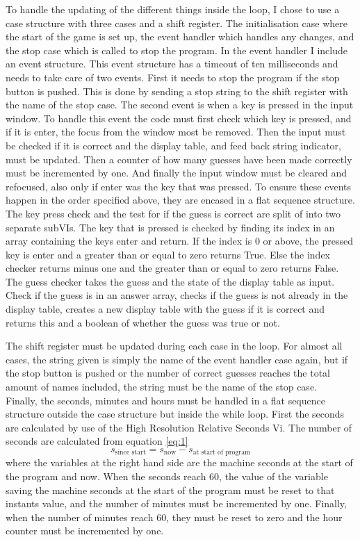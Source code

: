 \documentclass[11pt, A4paper, english]{article}
\begin{document}
To handle the updating of the different things inside the loop, I chose to use a case structure with three cases and a shift register. The initialisation case where the start of the game is set up, the event handler which handles any changes, and the stop case which is called to stop the program. In the event handler I include an event structure. This event structure has a timeout of ten milliseconds and needs to take care of two events. First it needs to stop the program if the stop button is pushed. This is done by sending a stop string to the shift register with the name of the stop case. The second event is when a key is pressed in the input window. To handle this event the code must first check which key is pressed, and if it is enter, the focus from the window most be removed. Then the input must be checked if it is correct and the display table, and feed back string indicator, must be updated. Then a counter of how many guesses have been made correctly must be incremented by one. And finally the input window must be cleared and refocused, also only if enter was the key that was pressed. To ensure these events happen in the order specified above, they are encased in a flat sequence structure. \\

The key press check and the test for if the guess is correct are split of into two separate subVIs. The key that is pressed is checked by finding its index in an array containing the keys enter and return. If the index is 0 or above, the pressed key is enter and a greater than or equal to zero returns True. Else the index checker returns minus one and the greater than or equal to zero returns False. The guess checker takes the guess and the state of the display table as input. Check if the guess is in an answer array, checks if the guess is not already in the display table, creates a new display table with the guess if it is correct and returns this and a boolean of whether the guess was true or not.

The shift register must be updated during each case in the loop. For almost all cases, the string given is simply the name of the event handler case again, but if the stop button is pushed or the number of correct guesses reaches the total amount of names included, the string must be the name of the stop case. \\

Finally, the seconds, minutes and hours must be handled in a flat sequence structure outside the case structure but inside the while loop. First the seconds are calculated by use of the High Resolution Relative Seconds Vi. The number of seconds are calculated from equation \ref{eq:1}
		\begin{equation}
s_{\text{since start}} = s_{\text{now}} - s_{\text{at start of program}}
\label{eq:1}
		\end{equation}
where the variables at the right hand side are the machine seconds at the start of the program and now. When the seconds reach 60, the value of the variable saving the machine seconds at the start of the program must be reset to that instants value, and the number of minutes must be incremented by one. Finally, when the number of minutes reach 60, they must be reset to zero and the hour counter must be incremented by one.
\end{document}
